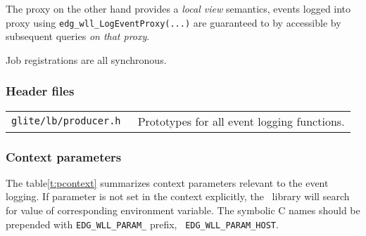 The \LB proxy on the other hand provides a \emph{local view}
semantics, events logged into proxy using
\verb'edg_wll_LogEventProxy(...)' are guaranteed to by accessible by
subsequent queries \emph{on that proxy}.

Job registrations are all synchronous.

\subsubsection{Header files}

\begin{table}[h]
\begin{tabularx}{\textwidth}{>{\tt}lX}
glite/lb/producer.h & Prototypes for all event logging functions. \\
\end{tabularx}
\end{table}

\subsubsection{Context parameters}
The table\ref{t:pcontext} summarizes context parameters relevant to the
event logging. If  parameter is not set in the context explicitly, the
\LB\ library will search for value of corresponding environment
variable. The symbolic C names should be prepended with
\verb'EDG_WLL_PARAM_' prefix, \ie\ \verb'EDG_WLL_PARAM_HOST'.

